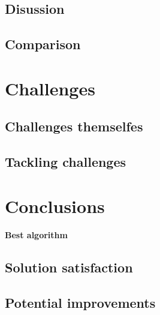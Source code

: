 \documentclass[12pt]{article}
\begin{document}
\subsection{Disussion}
\subsection{Comparison}

\section{Challenges}
\subsection{Challenges themselfes}
\subsection{Tackling challenges}

\section{Conclusions}
\paragraph{Best algorithm}
\subsection{Solution satisfaction}
\subsection{Potential improvements}
\end{document}
